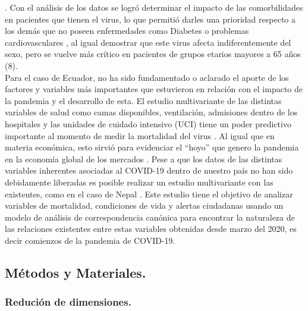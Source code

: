 \citep{Chen2020} . Con el análisis de los datos se logró determinar el
impacto de las comorbilidades en pacientes que tienen el virus, lo que
permitió darles una prioridad respecto a los demás que no poseen
enfermedades como Diabetes o problemas cardiovasculares \citep{Li2020}
\citep{Pal2020} \citep{Zhang2020}, al igual demostrar que este virus
afecta indiferentemente del sexo, pero se vuelve más crítico en
pacientes de grupos etarios mayores a 65 años (8).\\
Para el caso de Ecuador, no ha sido fundamentado o aclarado el aporte de
los factores y variables más importantes que estuvieron en relación con
el impacto de la pandemia y el desarrollo de esta. El estudio
multivariante de las distintas variables de salud como camas
disponibles, ventilación, admisiones dentro de los hospitales y las
unidades de cuidado intensivo (UCI) tiene un poder predictivo importante
al momento de medir la mortalidad del virus \citep{Fatima2020}. Al igual
que en materia económica, esto sirvió para evidenciar el ``hoyo'' que
genero la pandemia en la economía global de los mercados
\citep{Sharma2020}. Pese a que los datos de las distintas variables
inherentes asociadas al COVID-19 dentro de nuestro país no han sido
debidamente liberadas es posible realizar un estudio multivariante con
las existentes, como en el caso de Nepal \citep{Devkota2021}. Este
estudio tiene el objetivo de analizar variables de mortalidad,
condiciones de vida y alertas ciudadanas usando un modelo de análisis de
correspondencia canónica para encontrar la naturaleza de las relaciones
existentes entre estas variables obtenidas desde marzo del 2020, es
decir comienzos de la pandemia de COVID-19.

\hypertarget{muxe9todos-y-materiales.}{%
\subsection{Métodos y Materiales.}\label{muxe9todos-y-materiales.}}

\hypertarget{reduciuxf3n-de-dimensiones.}{%
\subsubsection{Redución de
dimensiones.}\label{reduciuxf3n-de-dimensiones.}}

